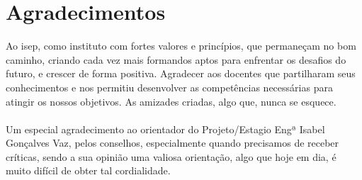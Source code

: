 \chapter*{Agradecimentos}
\label{Agradecimentos}
Ao \ac{isep}, como instituto com fortes valores e princípios, que permaneçam no bom caminho, criando cada vez mais formandos aptos para enfrentar os desafios do futuro, e crescer de forma positiva. Agradecer aos docentes que partilharam seus conhecimentos e nos permitiu desenvolver as competências necessárias para atingir os nossos objetivos. As amizades criadas, algo que, nunca se esquece.\\
\\
Um especial agradecimento ao orientador do Projeto/Estagio Engª Isabel Gonçalves Vaz, pelos conselhos, especialmente quando precisamos de receber críticas, sendo a sua opinião uma valiosa orientação, algo que hoje em dia, é muito difícil de obter tal cordialidade.

